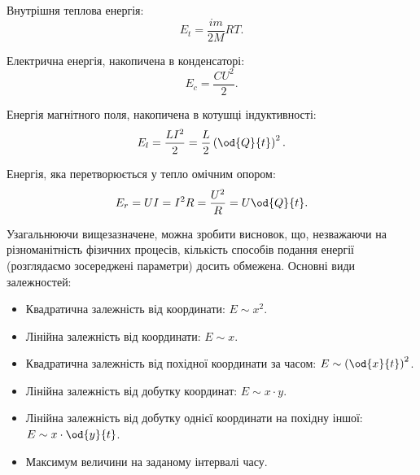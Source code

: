 Внутрішня теплова енергія:
%
\begin{equation}
  E_t = \frac{im}{2M} RT.
  \label{atu:eq:Et}
\end{equation}

Електрична енергія, накопичена в конденсаторі:
%
\begin{equation}
  E_c = \frac{C U^2}{2}.
  \label{atu:eq:Ec}
\end{equation}

Енергія магнітного поля, накопичена в котушці індуктивності:
%
\begin{equation}
  E_l = \frac{L I^2}{2} = \frac{L}{2} \left( \od{Q}{t}\right)^2 .
  \label{atu:eq:El}
\end{equation}

Енергія, яка перетворюється у тепло омічним опором:
%
\begin{equation}
  E_r = U I = I^2 R = \frac{U^2}{R} = U \od{Q}{t} .
  \label{atu:eq:Er}
\end{equation}


%


Узагальнюючи вищезазначене, можна зробити висновок, що, незважаючи на
різноманітність фізичних процесів, кількість способів подання енергії
(розглядаємо зосереджені параметри) досить обмежена. Основні види залежностей:

\begin{itemize}

  \item
    Квадратична залежність від координати:
    $E \sim x^2$.

  \item
    Лінійна залежність від координати:
    $E \sim x$.

  \item
    Квадратична залежність від похідної координати за часом:
    $E \sim \left( \od{x}{t}\right)^2$.

  \item
    Лінійна залежність від добутку координат:
    $E \sim x \cdot y$.

  \item
    Лінійна залежність від добутку однієї координати на похідну іншої:
    $E \sim x \cdot \od{y}{t}$.

  \item
  Максимум величини на заданому інтервалі часу.

\end{itemize}

